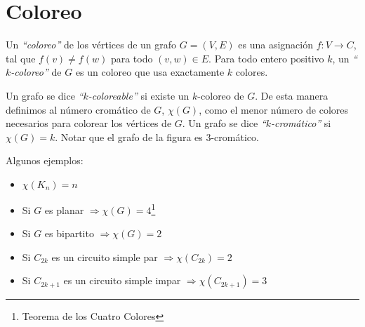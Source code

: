 \newpage
\section{Coloreo}

Un \emph{``coloreo''} de los v\'ertices de un grafo $G = (V, E)$ es una asignaci\'on $f : V \rightarrow C$, tal que $f(v) \neq f(w)$ para todo $(v,w) \in E$. Para todo entero positivo $k$, un \emph{``$k$-coloreo''} de $G$ es un coloreo que usa exactamente $k$ colores.

\raggedright
\bigskip
\begin{center}
\end{center}
\raggedright
\bigskip

Un grafo se dice \emph{``$k$-coloreable''} si existe un $k$-coloreo de $G$. De esta manera definimos al n\'umero crom\'atico de $G$, $\chi(G)$, como el menor n\'umero de colores necesarios para colorear los v\'ertices de $G$. Un grafo se dice \emph{``$k$-crom\'atico''} si $\chi(G) = k$. Notar que el grafo de la figura es $3$-crom\'atico.

Algunos ejemplos:

\begin{itemize}
\item $\chi(K_n) = n$
\item Si $G$ es planar $\Rightarrow \chi(G) = 4$\footnote{Teorema de los Cuatro Colores}
\item Si $G$ es bipartito $\Rightarrow \chi(G) = 2$
\item Si $C_{2k}$ es un circuito simple par $\Rightarrow \chi(C_{2k}) = 2$
\item Si $C_{2k+1}$ es un circuito simple impar $\Rightarrow \chi(C_{2k+1}) = 3$\
\end{itemize}



